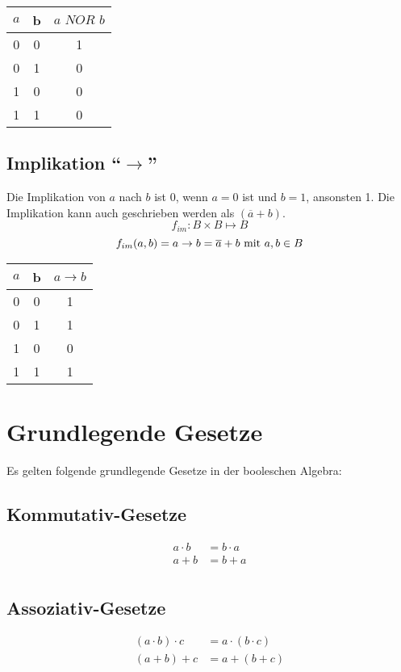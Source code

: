 \begin{center}
\begin{tabular}{ccc}
	$a$ & b & $a \textit{ NOR } b$ \\ \hline
	 0  & 0 &    1    \\
	 0  & 1 &    0    \\
	 1  & 0 &    0    \\
	 1  & 1 &    0    \\
\end{tabular}
\end{center}

\subsection{Implikation "`$\rightarrow$"'}
Die Implikation von $a$ nach $b$ ist 0, wenn $a = 0$ ist und $b = 1$, ansonsten 1. Die Implikation kann auch geschrieben werden als $(\overline{a} + b)$.
$$ f_{im}: B \times B \mapsto B $$
$$ f_{im}(a, b) = a \rightarrow b = \overline{a} + b \textnormal{ mit } a, b \in B$$

\begin{center}
\begin{tabular}{ccc}
	$a$ & b & $a \rightarrow b$ \\ \hline
	 0  & 0 &    1    \\
	 0  & 1 &    1    \\
	 1  & 0 &    0    \\
	 1  & 1 &    1    \\
\end{tabular}
\end{center}

\section{Grundlegende Gesetze}
Es gelten folgende grundlegende Gesetze in der booleschen Algebra:

\subsection*{Kommutativ-Gesetze}
\begin{align*}
	a \cdot b & = b \cdot a \\
	a + b & = b + a \\
\end{align*}

\subsection*{Assoziativ-Gesetze}
\begin{align*}
	(a \cdot b) \cdot c & = a \cdot (b \cdot c) \\
	(a + b) + c & = a + (b + c) \\
\end{align*}

